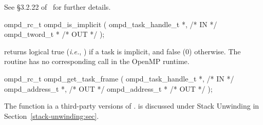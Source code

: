 \crossreferences
See \S3.2.22 of~\cite{OpenMP} for further details.

\summary

\format
\ccppspecificstart
\begin{boxedcode}
ompd\_rc\_t ompd\_is\_implicit (
  ompd\_task\_handle\_t  *,                                 /* IN */
  ompd\_tword\_t        *                                         /* OUT */
); 
\end{boxedcode}
\ccppspecificend

\descr
{} returns logical true (\textit{i.e.}, )
if a task is implicit, and false (0) otherwise.
The routine has no corresponding call in the OpenMP runtime.

\argdesc

\crossreferences



%
\summary

\format
\ccppspecificstart
\begin{boxedcode}
ompd\_rc\_t ompd\_get\_task\_frame (
  ompd\_task\_handle\_t        *,                           /* IN */
  ompd\_address\_t            *,                    /* OUT */
  ompd\_address\_t            *                  /* OUT */
);
\end{boxedcode}
\ccppspecificend

\descr
The function 
ia a third-party versions of .
%
 is discussed under Stack Unwinding in
Section~\ref{stack-unwinding:sec}.
%

\argdesc

\crossreferences

%

